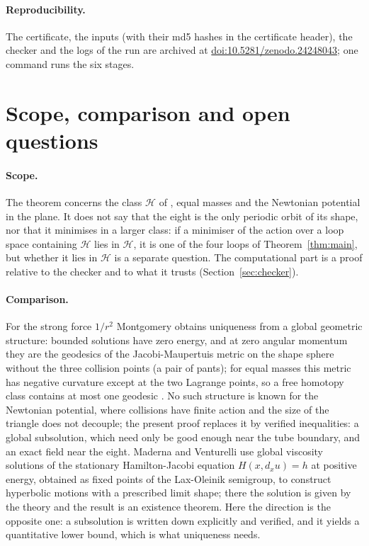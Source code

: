 \documentclass[11pt]{article}
\theoremstyle{definition}
\begin{document}
\paragraph{Reproducibility.} The certificate, the inputs (with their md5 hashes in the certificate header), the checker
and the logs of the run are archived at \href{https://doi.org/10.5281/zenodo.24248043}{doi:10.5281/zenodo.24248043}; one command runs the six stages.

\section{Scope, comparison and open questions}\label{sec:scope}
\paragraph{Scope.} The theorem concerns the class $\mathcal H$ of \cite{CM}, equal masses and the Newtonian potential in
the plane. It does not say that the eight is the only periodic orbit of its shape, nor that it minimises in a larger
class: if a minimiser of the action over a loop space containing $\mathcal H$ lies in $\mathcal H$, it is one of the four
loops of Theorem~\ref{thm:main}, but whether it lies in $\mathcal H$ is a separate question. The computational part
is a proof relative to the checker and to what it trusts (Section~\ref{sec:checker}).

\paragraph{Comparison.} For the strong force $1/r^2$ Montgomery \cite{Mpants} obtains uniqueness from a global
geometric structure: bounded solutions have zero energy, and at zero angular momentum they are the geodesics of the
Jacobi-Maupertuis metric on the shape sphere without the three collision points (a pair of pants); for equal masses
this metric has negative curvature except at the two Lagrange points, so a free homotopy class contains at most one
geodesic \cite{Mpants}. No such structure is known for the Newtonian potential, where
collisions have finite action and the size of the triangle does not decouple; the present proof replaces it by
verified inequalities: a global subsolution, which need only be good enough near the tube boundary, and an exact field
near the eight. Maderna and Venturelli \cite{MV20} use global viscosity solutions of the stationary Hamilton-Jacobi
equation $H(x,d_xu)=h$ at positive energy, obtained as fixed points of the Lax-Oleinik semigroup, to construct
hyperbolic motions with a prescribed limit shape; there the solution is given by the theory and the result is an
existence theorem. Here the direction is the opposite one: a subsolution is written down
explicitly and verified, and it yields a quantitative lower bound, which is what uniqueness needs.
\end{document}
